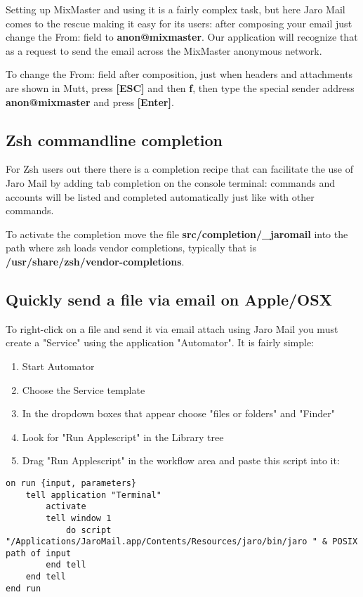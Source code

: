 \documentclass[a4,onecolumn,portrait]{article}
\begin{document}
Setting up MixMaster and using it is a fairly complex task, but
here Jaro Mail comes to the rescue making it easy for its users:
after composing your email just change the From: field to
\textbf{anon@mixmaster}. Our application will recognize that as a request
to send the email across the MixMaster anonymous network.

To change the From: field after composition, just when headers and
attachments are shown in Mutt, press \textbf{[ESC]} and then \textbf{f}, then
type the special sender address \textbf{anon@mixmaster} and press \textbf{[Enter]}.
\subsection{Zsh commandline completion}
\label{sec-11-2}

For Zsh users out there there is a completion recipe that can
facilitate the use of Jaro Mail by adding tab completion on the
console terminal: commands and accounts will be listed and
completed automatically just like with other commands.

To activate the completion move the file \textbf{src/completion/\_jaromail}
into the path where zsh loads vendor completions, typically that is
\textbf{/usr/share/zsh/vendor-completions}.
\subsection{Quickly send a file via email on Apple/OSX}
\label{sec-11-3}

To right-click on a file and send it via email attach using Jaro
Mail you must create a "Service" using the application
"Automator". It is fairly simple:

\begin{enumerate}
\item Start Automator
\item Choose the Service template
\item In the dropdown boxes that appear choose "files or folders" and "Finder"
\item Look for "Run Applescript" in the Library tree
\item Drag "Run Applescript" in the workflow area and paste this script into it:
\end{enumerate}

\begin{verbatim}
on run {input, parameters}
	tell application "Terminal"
		activate
		tell window 1
			do script "/Applications/JaroMail.app/Contents/Resources/jaro/bin/jaro " & POSIX path of input
		end tell
	end tell
end run
\end{verbatim}
\end{document}
